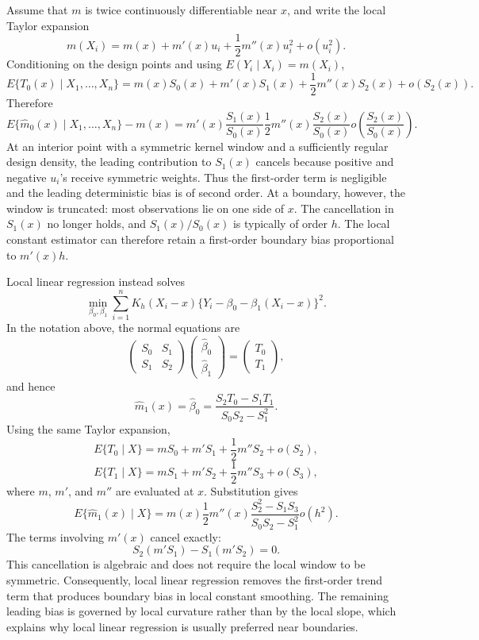 \documentclass[12pt,a4paper]{article}
\begin{document}
Assume that \(m\) is twice continuously differentiable near \(x\), and write the local Taylor expansion
\[
m(X_i)=m(x)+m'(x)u_i+\frac{1}{2}m''(x)u_i^2+o(u_i^2).
\]
Conditioning on the design points and using \(E(Y_i\mid X_i)=m(X_i)\),
\[
E\{T_0(x)\mid X_1,\ldots,X_n\}
=m(x)S_0(x)+m'(x)S_1(x)+\frac{1}{2}m''(x)S_2(x)+o(S_2(x)).
\]
Therefore
\[
E\{\hat m_0(x)\mid X_1,\ldots,X_n\}-m(x)
=m'(x)\frac{S_1(x)}{S_0(x)}
\frac{1}{2}m''(x)\frac{S_2(x)}{S_0(x)}
o\!\left(\frac{S_2(x)}{S_0(x)}\right).
\]
At an interior point with a symmetric kernel window and a sufficiently regular design density, the leading contribution to \(S_1(x)\) cancels because positive and negative \(u_i\)'s receive symmetric weights. Thus the first-order term is negligible and the leading deterministic bias is of second order. At a boundary, however, the window is truncated: most observations lie on one side of \(x\). The cancellation in \(S_1(x)\) no longer holds, and \(S_1(x)/S_0(x)\) is typically of order \(h\). The local constant estimator can therefore retain a first-order boundary bias proportional to \(m'(x)h\).

Local linear regression instead solves
\[
\min_{\beta_0,\beta_1}
\sum_{i=1}^{n}K_h(X_i-x)
\{Y_i-\beta_0-\beta_1(X_i-x)\}^2.
\]
In the notation above, the normal equations are
\[
\begin{pmatrix}
S_0 & S_1\\
S_1 & S_2
\end{pmatrix}
\begin{pmatrix}
\hat\beta_0\\
\hat\beta_1
\end{pmatrix}
=
\begin{pmatrix}
T_0\\
T_1
\end{pmatrix},
\]
and hence
\[
\hat m_1(x)=\hat\beta_0
=\frac{S_2T_0-S_1T_1}{S_0S_2-S_1^2}.
\]
Using the same Taylor expansion,
\[
E\{T_0\mid X\}
=mS_0+m'S_1+\frac{1}{2}m''S_2+o(S_2),
\]
\[
E\{T_1\mid X\}
=mS_1+m'S_2+\frac{1}{2}m''S_3+o(S_3),
\]
where \(m\), \(m'\), and \(m''\) are evaluated at \(x\). Substitution gives
\[
E\{\hat m_1(x)\mid X\}
=m(x)
\frac{1}{2}m''(x)
\frac{S_2^2-S_1S_3}{S_0S_2-S_1^2}
o(h^2).
\]
The terms involving \(m'(x)\) cancel exactly:
\[
S_2(m'S_1)-S_1(m'S_2)=0.
\]
This cancellation is algebraic and does not require the local window to be symmetric. Consequently, local linear regression removes the first-order trend term that produces boundary bias in local constant smoothing. The remaining leading bias is governed by local curvature rather than by the local slope, which explains why local linear regression is usually preferred near boundaries.
\end{document}
